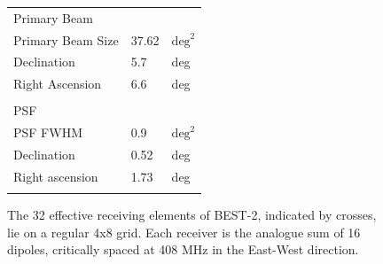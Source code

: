 \documentclass[useAMS,macros,usenatbib,onecolumn]{mn2e}
\begin{document}
\begin{figure}
\begin{minipage}[c]{0.475\textwidth}
\begin{tabular}{| l | l | l |}
				      &            &            	\\
      \hline
      Primary Beam 			&            &           	\\
      \hline
      Primary Beam Size 		&      37.62 & $\textrm{deg}^2$ \\
      Declination 			&        5.7 &        deg 	\\
      Right Ascension 		&        6.6 &        deg 	\\
				      &            &            	\\
      \hline
      PSF    				&            &       		\\
      \hline
      PSF FWHM 			&        0.9 & $\textrm{deg}^2$ \\
      Declination 			&       0.52 &     deg 		\\
      Right ascension 		&       1.73 &     deg 		\\
				      &            &            	\\
      \hline
      \end{tabular}     
  \end{minipage}
  \begin{minipage}[t]{0.475\textwidth}
        \caption{The 32 effective receiving elements of BEST-2, indicated by crosses, lie on a regular 4x8 grid. Each receiver is the analogue sum of 16 dipoles, critically spaced at 408 MHz in the East-West direction.}
        \label{fig:ant_layout}
  \end{minipage}
  \hspace{0.035\textwidth}
  \begin{minipage}[t]{0.475\textwidth}
        \label{tbl:best2}
  \end{minipage}
\end{figure}
  
\end{document}
